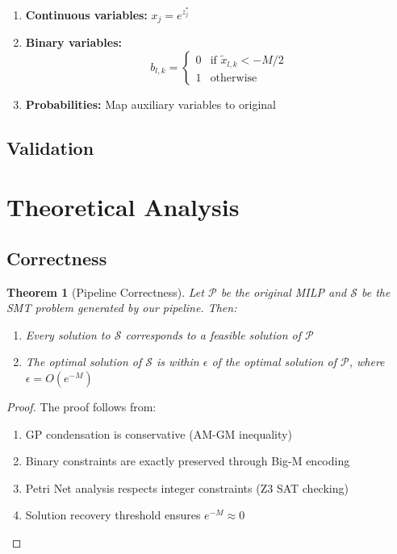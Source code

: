 \documentclass[11pt]{article}
\newtheorem{theorem}{Theorem}
\begin{document}
\begin{enumerate}
    \item \textbf{Continuous variables:} $x_j = e^{z_j^*}$
    \item \textbf{Binary variables:}
    \begin{equation}
        b_{l,k} = \begin{cases}
            0 & \text{if } \tilde{x}_{l,k} < -M/2 \\
            1 & \text{otherwise}
        \end{cases}
    \end{equation}
    \item \textbf{Probabilities:} Map auxiliary variables to original
\end{enumerate}

\subsection{Validation}


\section{Theoretical Analysis}

\subsection{Correctness}

\begin{theorem}[Pipeline Correctness]
  Let $\mathcal{P}$ be the original MILP and $\mathcal{S}$ be the SMT
  problem generated by our pipeline. Then:
\begin{enumerate}
\item Every solution to $\mathcal{S}$ corresponds to a feasible
  solution of $\mathcal{P}$
\item The optimal solution of $\mathcal{S}$ is within $\epsilon$ of
  the optimal solution of $\mathcal{P}$, where $\epsilon = O(e^{-M})$
\end{enumerate}
\end{theorem}

\begin{proof}
The proof follows from:
\begin{enumerate}
    \item GP condensation is conservative (AM-GM inequality)
    \item Binary constraints are exactly preserved through Big-M encoding
    \item Petri Net analysis respects integer constraints (Z3 SAT checking)
    \item Solution recovery threshold ensures $e^{-M} \approx 0$
\end{enumerate}
\end{proof}
\end{document}
